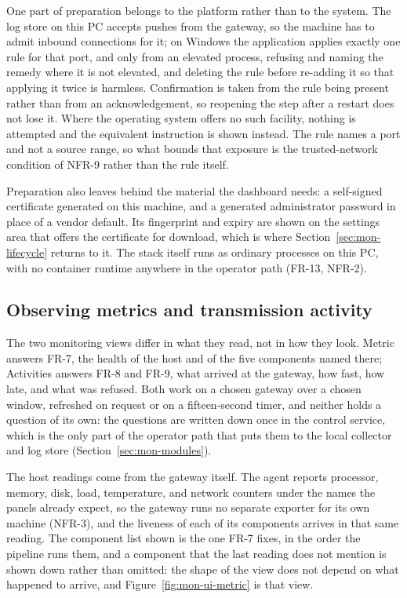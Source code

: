 \documentclass[12pt,a4paper]{report}
\begin{document}
One part of preparation belongs to the platform rather than to the
system. The log store on this PC accepts pushes from the gateway, so
the machine has to admit inbound connections for it; on Windows the
application applies exactly one rule for that port, and only from an
elevated process, refusing and naming the remedy where it is not
elevated, and deleting the rule before re-adding it so that applying it
twice is harmless. Confirmation is taken from the rule being present
rather than from an acknowledgement, so reopening the step after a
restart does not lose it. Where the operating system offers no such
facility, nothing is attempted and the equivalent instruction is shown
instead. The rule names a port and not a source range, so what bounds
that exposure is the trusted-network condition of NFR-9 rather than the
rule itself.

Preparation also leaves behind the material the dashboard needs: a
self-signed certificate generated on this machine, and a generated
administrator password in place of a vendor default. Its fingerprint
and expiry are shown on the settings area that offers the certificate
for download, which is where Section~\ref{sec:mon-lifecycle} returns to
it. The stack itself runs as ordinary processes on this PC, with no
container runtime anywhere in the operator path (FR-13, NFR-2).

\subsection{Observing metrics and transmission activity}
\label{sec:mon-views}

The two monitoring views differ in what they read, not in how they
look. Metric answers FR-7, the health of the host and of the five
components named there; Activities answers FR-8 and FR-9, what arrived
at the gateway, how fast, how late, and what was refused. Both work on
a chosen gateway over a chosen window, refreshed on request or on a
fifteen-second timer, and neither holds a question of its own: the
questions are written down once in the control service, which is the
only part of the operator path that puts them to the local collector
and log store (Section~\ref{sec:mon-modules}).

The host readings come from the gateway itself. The agent reports
processor, memory, disk, load, temperature, and network counters under
the names the panels already expect, so the gateway runs no separate
exporter for its own machine (NFR-3), and the liveness of each of its
components arrives in that same reading. The component list shown is
the one FR-7 fixes, in the order the pipeline runs them, and a
component that the last reading does not mention is shown down rather
than omitted: the shape of the view does not depend on what happened to
arrive, and Figure~\ref{fig:mon-ui-metric} is that view.
\end{document}
